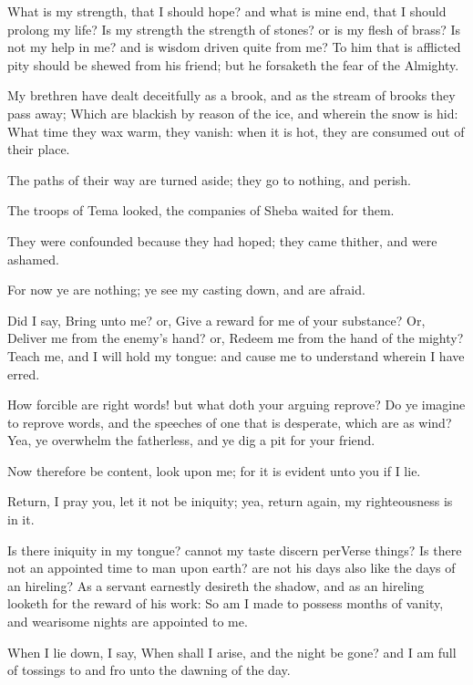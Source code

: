 \Verse What is my strength, that I should hope? and what is mine end, that I should prolong my life?  \Verse Is my strength the strength of stones? or is my flesh of brass?  \Verse Is not my help in me? and is wisdom driven quite from me?  \Verse To him that is afflicted pity should be shewed from his friend; but he forsaketh the fear of the Almighty.

\Verse My brethren have dealt deceitfully as a brook, and as the stream of brooks they pass away; \Verse Which are blackish by reason of the ice, and wherein the snow is hid: \Verse What time they wax warm, they vanish: when it is hot, they are consumed out of their place.

\Verse The paths of their way are turned aside; they go to nothing, and perish.

\Verse The troops of Tema looked, the companies of Sheba waited for them.

\Verse They were confounded because they had hoped; they came thither, and were ashamed.

\Verse For now ye are nothing; ye see my casting down, and are afraid.

\Verse Did I say, Bring unto me? or, Give a reward for me of your substance?  \Verse Or, Deliver me from the enemy's hand? or, Redeem me from the hand of the mighty?  \Verse Teach me, and I will hold my tongue: and cause me to understand wherein I have erred.

\Verse How forcible are right words! but what doth your arguing reprove?  \Verse Do ye imagine to reprove words, and the speeches of one that is desperate, which are as wind?  \Verse Yea, ye overwhelm the fatherless, and ye dig a pit for your friend.

\Verse Now therefore be content, look upon me; for it is evident unto you if I lie.

\Verse Return, I pray you, let it not be iniquity; yea, return again, my righteousness is in it.

\Verse Is there iniquity in my tongue? cannot my taste discern perVerse things?  
\Chapter
\Verse Is there not an appointed time to man upon earth? are not his days also like the days of an hireling?  \Verse As a servant earnestly desireth the shadow, and as an hireling looketh for the reward of his work: \Verse So am I made to possess months of vanity, and wearisome nights are appointed to me.

\Verse When I lie down, I say, When shall I arise, and the night be gone?  and I am full of tossings to and fro unto the dawning of the day.

